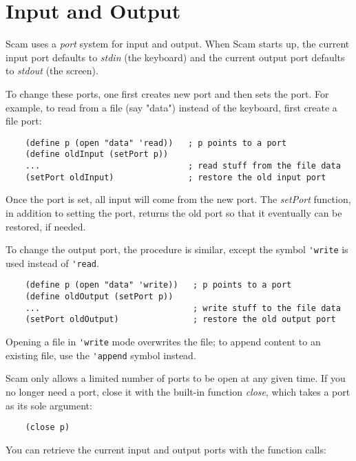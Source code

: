 \chapter{Input and Output}
\label{InputAndOutput}

Scam uses a {\it port} system for input and output.
When Scam starts up, the current input port defaults to
{\it stdin} (the keyboard) and the current output
port defaults to {\it stdout} (the screen).

To change these ports, one first creates new port
and then sets the port.
For example, to read from a file (say "data")
instead of the keyboard,
first create a file port:

\begin{verbatim}
    (define p (open "data" 'read))   ; p points to a port
    (define oldInput (setPort p))
    ...                              ; read stuff from the file data
    (setPort oldInput)               ; restore the old input port
\end{verbatim}

Once the port is set, all input will come from the new port.
The {\it setPort} function, in addition to setting the port, returns
the old port so that it eventually can be restored, if needed.

To change the output port, the procedure is similar, except
the symbol \verb!'write! is used instead of \verb!'read!.

\begin{verbatim}
    (define p (open "data" 'write))   ; p points to a port
    (define oldOutput (setPort p))
    ...                               ; write stuff to the file data
    (setPort oldOutput)               ; restore the old output port
\end{verbatim}

Opening a file in \verb!'write! mode overwrites the file;
to append content to an existing file, use the \verb!'append!
symbol instead.

Scam only allows a limited number of ports to be open at
any given time. If you no longer need a port, close it with
the built-in function {\it close}, which takes a port as its
sole argument:

\begin{verbatim}
    (close p)
\end{verbatim}

You can retrieve the current input and output ports with the function
calls:

